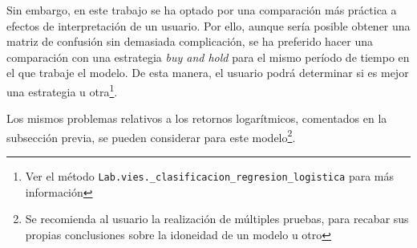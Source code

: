 Sin embargo, en este trabajo se ha optado por una comparación más práctica a efectos de interpretación de un usuario. Por ello, aunque sería posible obtener una matriz de confusión sin demasiada complicación, se ha preferido hacer una comparación con una estrategia \emph{buy and hold} para el mismo período de tiempo en el que trabaje el modelo. De esta manera, el usuario podrá determinar si es mejor una estrategia u otra\footnote{Ver el método \texttt{Lab.vies.\_clasificacion\_regresion\_logistica} para más información}.

Los mismos problemas relativos a los retornos logarítmicos, comentados en la subsección previa, se pueden considerar para este modelo\footnote{Se recomienda al usuario la realización de múltiples pruebas, para recabar sus propias conclusiones sobre la idoneidad de un modelo u otro}.